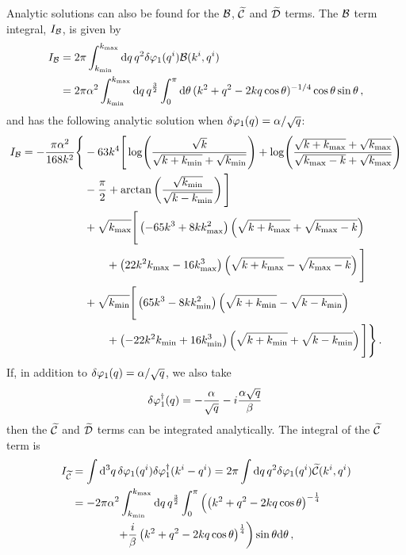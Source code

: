 % 
% 
Analytic solutions can also be found for the $\mathcal{B}$, $\widetilde{\mathcal{C}}$ and $\widetilde{\mathcal{D}}$ terms.
The $\mathcal{B}$ term integral, $I_{\mathcal{B}}$, is given by
% 
\begin{align}
 \label{eq:bintegral-num}
I_\B &= 2\pi \int_{\kmin}^{\kmax} \d q\, q^2\dvp1(\qvi)\B(\kvi,\qvi) \nonumber\\
% 
     &= 2\pi\alpha^2 \int_{\kmin}^{\kmax} \d q\, q^{\frac{3}{2}}
\int_{0}^{\pi} \d\theta\, (k^2 + q^2 -2k q \cos{\theta})^{-1/4}
\cos{\theta}\sin{\theta}\,,
\end{align}
% 
and has the following analytic solution when $\delta\varphi_{1}(q) = \alpha/\sqrt{q}$:
% 
\begin{align}
\label{eq:intb-soln-num}
 I_\B = -\frac{\pi\alpha^2}{168 k^2}\Bigg\{ 
        &-63 k^4 \Bigg[ \log\Biggl(\frac{\sqrt{k}}{\sqrt{k+\kmin} + \sqrt{\kmin}}
                            \Biggr)
         + \log\Biggl( \frac{\sqrt{k+\kmax} +\sqrt{\kmax}}{\sqrt{\kmax-k} +
                      \sqrt{\kmax}}\Biggr) \nonumber \\
        &-\frac{\pi}{2} + \arctan\left( \frac{\sqrt{\kmin}}{\sqrt{k-\kmin}}\right)
        \Bigg] \nonumber\\
% 
        &+\sqrt{\kmax}\Bigg[ \left(-65k^3 + 8k\kmax^2 \right)\left(\sqrt{k+\kmax} +
          \sqrt{\kmax-k}\right) \nonumber \\
        &\qquad +\left(22k^2\kmax -16\kmax^3\right) \left(\sqrt{k+\kmax} -
         \sqrt{\kmax -k} \right) \Bigg] \nonumber \\
        &+\sqrt{\kmin}\Bigg[ \left(65k^3 - 8k\kmin^2 \right)\left(\sqrt{k+\kmin} -
          \sqrt{k-\kmin}\right) \nonumber \\
        &\qquad +\left(-22k^2\kmin +16\kmin^3\right) \left(\sqrt{k+\kmin} +
         \sqrt{k-\kmin} \right) \Bigg] \Bigg\} \,.
\end{align}
% 
If, in addition to $\delta\varphi_{1}(q) = \alpha/\sqrt{q}$, we also take
% 
\begin{equation}
 \delta\varphi_{1}^{\dagger}(q) = -\frac{\alpha}{\sqrt{q}} -i\frac{\alpha\sqrt{q}}{\beta}\,
\end{equation}
% 
then the $\widetilde{\mathcal{C}}$ and $\widetilde{\mathcal{D}}$ terms can be integrated analytically.
The integral of the $\widetilde{\mathcal{C}}$ term is 
% 
\begin{align}
 \label{eq:cint-num}
I_{\wt{\C}} &= \int\d^3 q\, \dvp1(\qvi) \dN{\dvp1}(\kvi-\qvi) 
    = 2\pi \int \d q\, q^2 \dvp1(\qvi) \wt{\C}(\kvi, \qvi) \nonumber\\
% 
 &= -2\pi\alpha^2 \int_{\kmin}^{\kmax} \d q\, q^{\frac{3}{2}} \int_0^\pi 
     \left( \left(k^2 + q^2 -2kq \cos\theta\right)^{-\frac{1}{4}} \right.\nonumber \\
            &\qquad \qquad \left.+\frac{i}{\beta}\left(k^2 + q^2 -2kq
\cos\theta\right)^{\frac{1}{4}}
        \right) \sin\theta \d \theta\,,
\end{align}
